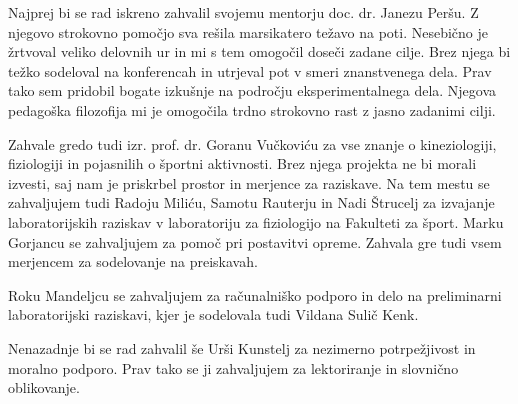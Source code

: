 \zahvalap
Najprej bi se rad iskreno zahvalil svojemu mentorju doc. dr. Janezu Peršu. Z njegovo strokovno pomočjo sva rešila marsikatero težavo na poti. Nesebično je žrtvoval veliko delovnih ur in mi s tem omogočil doseči zadane cilje. Brez njega bi težko sodeloval na konferencah in utrjeval pot v smeri znanstvenega dela. Prav tako sem pridobil bogate izkušnje na področju eksperimentalnega dela. Njegova pedagoška filozofija mi je omogočila trdno strokovno rast z jasno zadanimi cilji.

Zahvale gredo tudi izr. prof. dr. Goranu Vučkoviću za vse znanje o kineziologiji, fiziologiji in pojasnilih o športni aktivnosti. Brez njega projekta ne bi morali izvesti, saj nam je priskrbel prostor in merjence za raziskave. Na tem mestu se zahvaljujem tudi Radoju Miliću, Samotu Rauterju in Nadi Štrucelj za izvajanje laboratorijskih raziskav v laboratoriju za fiziologijo na Fakulteti za šport. Marku Gorjancu se zahvaljujem za pomoč pri postavitvi opreme. Zahvala gre tudi vsem merjencem za sodelovanje na preiskavah. 

Roku Mandeljcu se zahvaljujem za računalniško podporo in delo na preliminarni laboratorijski raziskavi, kjer je sodelovala tudi Vildana Sulič Kenk.

Nenazadnje bi se rad zahvalil še Urši Kunstelj za nezimerno potrpežjivost in moralno podporo. Prav tako se ji zahvaljujem za lektoriranje in slovnično oblikovanje.